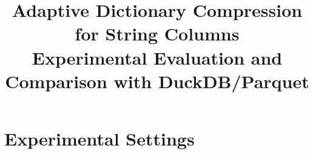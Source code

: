\documentclass[a4paper,11pt]{article}
\title{\textbf{Adaptive Dictionary Compression for String Columns}\\[0.5em]
       \large Experimental Evaluation and Comparison with DuckDB/Parquet}
\author{}
\date{}
\begin{document}
\maketitle
\tableofcontents
\newpage

\section{Experimental Settings}



\end{document}

